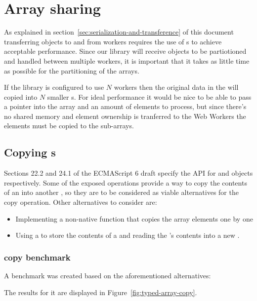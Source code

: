 \section{Array sharing}

As explained in section~\ref{sec:serialization-and-transference} of this document transferring \ttarray{} objects to and from workers requires the use of s to achieve acceptable performance. Since our library will receive \ttarray{} objects to be partiotioned and handled between multiple workers, it is important that it takes as little time as possible for the partitioning of the arrays.

If the library is configured to use \(N\) workers then the original data in the \ttarray{} will copied into \(N\) smaller \ttarray{}s. For ideal performance it would be nice to be able to pass a pointer into the array and an amount of elements to process, but since there's no shared memory and element ownership is tranferred to the Web Workers the elements must be copied to the sub-arrays.

\subsection{Copying \ttarray{}s}
Sections 22.2 and 24.1 of the ECMAScript 6 draft \cite{es6} specify the API for \ttarray{} and \tabuffer{} objects respectively. Some of the exposed operations provide a way to copy the contents of an \tabuffer{} into another \tabuffer{}, so they are to be considered as viable alternatives for the copy operation. Other alternatives to consider are:
\begin{itemize}
  \item Implementing a non-native function that copies the array elements one by one
  \item Using a  to store the contents of a \ttarray{} and reading the 's contents into a new \ttarray{}.
\end{itemize}

\subsubsection{\ttarray{} copy benchmark}
A benchmark was created based on the aforementioned alternatives:

The results for it are displayed in Figure~\ref{fig:typed-array-copy}.


